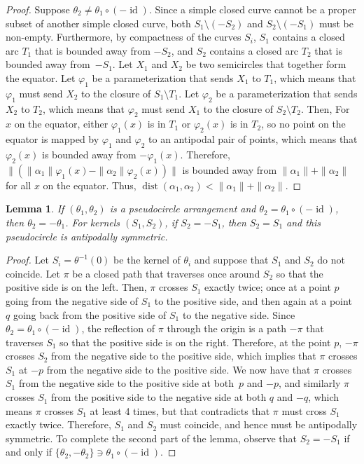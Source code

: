 \documentclass[JEP,XML,SOM,Unicode,NoFloatCountersInSection,published]{cedram}
\newtheorem{lemma}[theorem]{Lemma}
\theoremstyle{remark}
\let\phi\varphi
\DeclareMathOperator{\dist}{dist}
\DeclareMathOperator{\id}{id}
\begin{document}
\begin{proof}
Suppose $\theta_2 \neq \theta_1\circ(-\id)$.
Since a simple closed curve cannot be a proper subset of another simple closed curve, both $S_1 \setminus (-S_2)$ and $S_2 \setminus (-S_1)$ must be non-empty.
Furthermore, by compactness of the curves $S_i$, $S_1$ contains a closed arc $T_1$ that is bounded away from $-S_2$, and $S_2$ contains a closed arc $T_2$ that is bounded away from~$-S_1$. Let $X_1$ and $X_2$ be two semicircles that together form the equator. Let $\phi_1$ be a parameterization that sends $X_1$ to $T_1$, which means that $\phi_1$ must send $X_2$ to the closure of $S_1\setminus T_1$. Let $\phi_2$ be a parameterization that sends $X_2$ to $T_2$, which means that $\phi_2$ must send $X_1$ to the closure of $S_2\setminus T_2$.
Then,
For $x$ on the equator, either $\phi_1(x)$ is in $T_1$ or $\phi_2(x)$ is in $T_2$, so
no point on the equator is mapped by $\phi_1$ and $\phi_2$ to an antipodal pair of points,
which means that $\phi_2(x)$ is bounded away from $-\phi_1(x)$.
Therefore, $\|(\|\alpha_1\|\phi_1(x) - \|\alpha_2\|\phi_2(x))\|$ is bounded away from $\|\alpha_1\| + \|\alpha_2\|$ for all $x$ on the equator. Thus, $\dist(\alpha_1,\alpha_2) < \|\alpha_1\|+\|\alpha_2\|$.
\end{proof}

\begin{lemma}\label{lemma-reflections}
If $(\theta_1,\theta_2)$ is a pseudocircle arrangement and $\theta_2 = \theta_1 \circ (-\id)$,
then $\theta_2 = -\theta_1$. For kernels $(S_1,S_2)$, if $S_2 = -S_1$, then $S_2 = S_1$ and this pseudocircle is antipodally symmetric.
\end{lemma}

\begin{proof}
Let $S_i = \theta^{-1}(0)$ be the kernel of $\theta_i$ and suppose that $S_1$ and $S_2$ do not coincide.
Let $\pi$ be a closed path that traverses once around $S_2$ so that the positive side is on the left.
Then, $\pi$ crosses $S_1$ exactly twice; once at a point $p$ going from the negative side of $S_1$ to the positive side, and then again at a point $q$ going back from the positive side of $S_1$ to the negative side.
Since $\theta_2 = \theta_1 \circ (-\id)$, the reflection of $\pi$ through the origin is a path $-\pi$ that traverses $S_1$ so that the positive side is on the right.
Therefore, at the point $p$, $-\pi$ crosses $S_2$ from the negative side to the positive side, which implies that $\pi$ crosses $S_1$ at $-p$ from the negative side to the positive side.
We now have that $\pi$ crosses $S_1$ from the negative side to the positive side at both~$p$ and $-p$, and similarly $\pi$ crosses $S_1$ from the positive side to the negative side at both $q$ and $-q$, which means $\pi$ crosses $S_1$ at least 4 times, but that contradicts that $\pi$ must cross $S_1$ exactly twice.
Therefore, $S_1$ and $S_2$ must coincide, and hence must be antipodally symmetric.
To complete the second part of the lemma, observe that $S_2 = -S_1$ if and only if $\{\theta_2,-\theta_2\} \ni \theta_1 \circ (-\id)$.
\end{proof}
\end{document}
